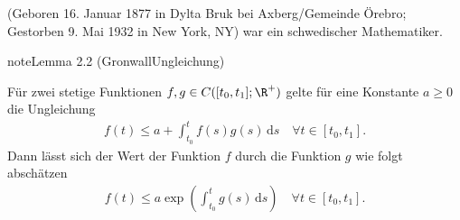\documentclass[letterpaper,10pt,english]{jupyterBook}
\begin{document}
\begin{sphinxShadowBox}

\sphinxAtStartPar
{} (Geboren 16. Januar 1877 in Dylta Bruk bei Axberg/Gemeinde Örebro; Gestorben 9. Mai 1932 in New York, NY) war ein schwedischer Mathematiker.
\end{sphinxShadowBox}
\label{odestability/ruhelagen:lemma:Gronwall}
\begin{sphinxadmonition}{note}{Lemma 2.2 (Gronwall\sphinxhyphen{}Ungleichung)}



\sphinxAtStartPar
Für zwei stetige Funktionen \(f,g\in C([t_0,t_1]; \R^+)\) gelte für eine Konstante \(a \geq 0\) die Ungleichung
\begin{equation*}
\begin{split}f(t) \leq a + \int_{t_0}^t f(s)g(s)\, \mathrm{d}s \quad \forall t\in [t_0,t_1].\end{split}
\end{equation*}
\sphinxAtStartPar
Dann lässt sich der Wert der Funktion \(f\) durch die Funktion \(g\) wie folgt abschätzen
\begin{equation*}
\begin{split}f(t) \leq a \exp{ \left(\int_{t_0}^t g(s)\, \mathrm{d}s \right)} \quad \forall t\in [t_0,t_1].\end{split}
\end{equation*}\end{sphinxadmonition}
\end{document}
